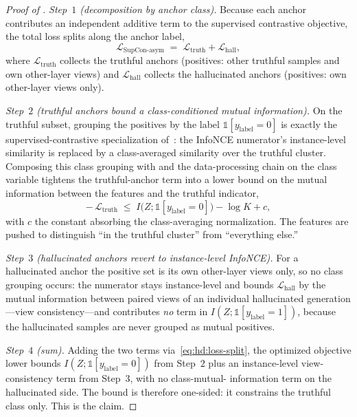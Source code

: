 \begin{proof}[Proof of ]
\emph{Step~$1$ (decomposition by anchor class).}
Because each anchor contributes an independent additive term to the supervised
contrastive objective, the total loss splits along the anchor label,
\begin{equation} \mathcal{L}_{\mathrm{SupCon\text{-}asym}} \;=\; \mathcal{L}_{\mathrm{truth}} + \mathcal{L}_{\mathrm{hall}}, \label{eq:hd:loss-split} \end{equation}
where $\mathcal{L}_{\mathrm{truth}}$ collects the truthful anchors (positives:
other truthful samples and own other-layer views) and
$\mathcal{L}_{\mathrm{hall}}$ collects the hallucinated anchors (positives: own
other-layer views only).

\emph{Step~$2$ (truthful anchors bound a class-conditioned mutual information).}
On the truthful subset, grouping the positives by the label
$\mathbb{1}[y_{\mathrm{label}}=0]$ is exactly the supervised-contrastive
specialization of~\citet{khosla2020supervised}: the InfoNCE numerator's
instance-level similarity is replaced by a class-averaged similarity over the
truthful cluster. Composing this class grouping with  and
the data-processing chain on the class variable tightens the truthful-anchor term
into a lower bound on the mutual information between the features and the truthful
indicator,
\begin{equation} -\,\mathcal{L}_{\mathrm{truth}} \;\le\; I\bigl(Z; \mathbb{1}[y_{\mathrm{label}}=0]\bigr) - \log K + c, \label{eq:hd:truth-bound} \end{equation}
with $c$ the constant absorbing the class-averaging normalization. The features
are pushed to distinguish ``in the truthful cluster'' from ``everything else.''

\emph{Step~$3$ (hallucinated anchors revert to instance-level InfoNCE).}
For a hallucinated anchor the positive set is its own other-layer views only, so
no class grouping occurs: the numerator stays instance-level and
 bounds $\mathcal{L}_{\mathrm{hall}}$ by the mutual
information between paired views of an individual hallucinated generation---view
consistency---and contributes \emph{no} term in
$I(Z; \mathbb{1}[y_{\mathrm{label}}=1])$, because the hallucinated samples are
never grouped as mutual positives.

\emph{Step~$4$ (sum).}
Adding the two terms via~\eqref{eq:hd:loss-split}, the optimized objective lower
bounds $I(Z; \mathbb{1}[y_{\mathrm{label}}=0])$ from Step~$2$ plus an
instance-level view-consistency term from Step~$3$, with no class-mutual-
information term on the hallucinated side. The bound is therefore one-sided: it
constrains the truthful class only. This is the claim.
\end{proof}

